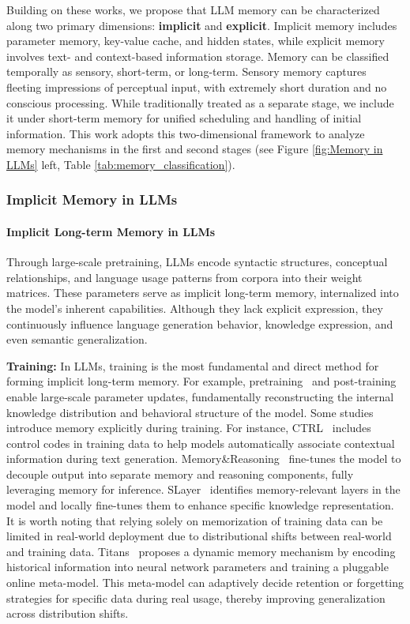 \documentclass[]{memtensor}
\begin{document}
Building on these works, we propose that LLM memory can be characterized along two primary dimensions:  \textbf{implicit} and 	\textbf{explicit}. Implicit memory includes parameter memory, key-value cache, and hidden states, while explicit memory involves text- and context-based information storage.
Memory can be classified temporally as sensory, short-term, or long-term. Sensory memory captures fleeting impressions of perceptual input, with extremely short duration and no conscious processing. While traditionally treated as a separate stage, we include it under short-term memory for unified scheduling and handling of initial information. This work adopts this two-dimensional framework to analyze memory mechanisms in the first and second stages (see Figure \ref{fig:Memory in LLMs} left, Table \ref{tab:memory_classification}).



\subsubsection{Implicit Memory in LLMs}
\paragraph{\textbf{Implicit Long-term Memory in LLMs}}
Through large-scale pretraining, LLMs encode syntactic structures, conceptual relationships, and language usage patterns from corpora into their weight matrices. These parameters serve as implicit long-term memory, internalized into the model's inherent capabilities. Although they lack explicit expression, they continuously influence language generation behavior, knowledge expression, and even semantic generalization.

\textbf{Training:}
In LLMs, training is the most fundamental and direct method for forming implicit long-term memory. For example, pretraining~\cite{devlin_bert_2019,brown_gpt3_2020} and post-training~\cite{bai_rlhf_2022,ouyang_instructgpt_2022} enable large-scale parameter updates, fundamentally reconstructing the internal knowledge distribution and behavioral structure of the model.
Some studies introduce memory explicitly during training. For instance, CTRL~\cite{keskar_ctrl_2019} includes control codes in training data to help models automatically associate contextual information during text generation. Memory\&Reasoning~\cite{jin_MemandReason_2024} fine-tunes the model to decouple output into separate memory and reasoning components, fully leveraging memory for inference. SLayer~\cite{chen_slayer_2024} identifies memory-relevant layers in the model and locally fine-tunes them to enhance specific knowledge representation.
It is worth noting that relying solely on memorization of training data can be limited in real-world deployment due to distributional shifts between real-world and training data.
Titans~\cite{DBLP:journals/corr/abs-2501-00663} proposes a dynamic memory mechanism by encoding historical information into neural network parameters and training a pluggable online meta-model. This meta-model can adaptively decide retention or forgetting strategies for specific data during real usage, thereby improving generalization across distribution shifts.
\end{document}

